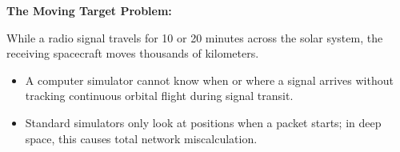 \documentclass[9pt]{article}
\begin{document}
\begin{minipage}[t]{0.32\textwidth}
\begin{tcolorbox}[posterbox, title=1. The Deep-Space Simulation Challenge, height=15.2cm]
        \vspace{2pt}
        \begin{tcolorbox}[colback=white, colframe=electricCyan!60, boxrule=0.8pt, arc=3pt, left=4pt, right=4pt, top=3pt, bottom=3pt]
            {\color{darkCyan}\textbf{The Moving Target Problem:}}\\[2pt]
            {\fontsize{7.5pt}{9.2pt}\selectfont 
            While a radio signal travels for 10 or 20 minutes across the solar system, the receiving spacecraft moves thousands of kilometers.
            \begin{itemize}[leftmargin=7pt, itemsep=1.5pt, topsep=2pt]
                \item A computer simulator cannot know when or where a signal arrives without tracking continuous orbital flight during signal transit.
                \item Standard simulators only look at positions when a packet starts; in deep space, this causes total network miscalculation.
            \end{itemize}}
        \end{tcolorbox}
    \end{tcolorbox}
\end{minipage}%
\hfill
\end{document}
